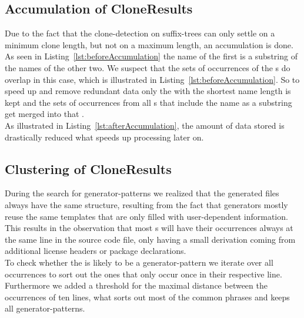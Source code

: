 \subsection{Accumulation of CloneResults}
Due to the fact that the clone-detection on suffix-trees can only settle on a minimum clone length, but not on a maximum length, an accumulation is done.\\
As seen in Listing~\ref{lst:beforeAccumulation} the name of the first  is a substring of the names of the other two. We suspect that the sets of occurrences of the s do overlap in this case, which is illustrated in Listing~\ref{lst:beforeAccumulation}. So to speed up and remove redundant data only the  with the shortest name length is kept and the sets of occurrences from all s that include the name as a substring get merged into that .\\
As illustrated in Listing~\ref{lst:afterAccumulation}, the amount of data stored is drastically reduced what speeds up processing later on.



\subsection{Clustering of CloneResults}
During the search for generator-patterns we realized that the generated files always have the same structure, resulting from the fact that generators mostly reuse the same templates that are only filled with user-dependent information.\\
This results in the observation that most s will have their occurrences always at the same line in the source code file, only having a small derivation coming from additional license headers or package declarations.\\
To check whether the  is likely to be a generator-pattern we iterate over all occurrences to sort out the ones that only occur once in their respective line. Furthermore we added a threshold for the maximal distance between the occurrences of ten lines, what sorts out most of the common phrases and keeps all generator-patterns.


